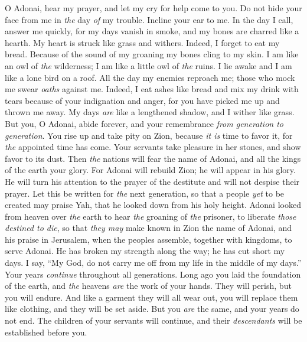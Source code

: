\begin{biblechapter} %
 O Adonai, hear my prayer, 
and let my cry for help come to you.
\verse Do not hide your face from me 
in \textit{the} day \textit{of} my trouble. 
Incline your ear to me. 
In the day I call, answer me quickly,
\verse for my days vanish in smoke, 
and my bones are charred like a hearth.
\verse My heart is struck like grass and withers. 
Indeed, I forget to eat my bread.
\verse Because of the sound of my groaning 
my bones cling to my skin.
\verse I am like an owl of \textit{the} wilderness; 
I am like a little owl of \textit{the} ruins.
\verse I lie awake and I am 
like a lone bird on a roof.
\verse All the day my enemies reproach me; 
those who mock me swear \textit{oaths} against me.
\verse Indeed, I eat ashes like bread 
and mix my drink with tears
\verse because of your indignation and anger, 
for you have picked me up and thrown me away.
\verse My days \textit{are} like a lengthened shadow, 
and I wither like grass.
\verse But you, O Adonai, abide forever, 
and your remembrance \textit{from generation to generation}.
\verse You rise up and take pity on Zion, 
because \textit{it is} time to favor it, 
for \textit{the} appointed time has come.
\verse Your servants take pleasure in her stones, 
and show favor to its dust.
\verse Then \textit{the} nations will fear the name of Adonai, 
and all the kings of the earth your glory.
\verse For Adonai will rebuild Zion; 
he will appear in his glory.
\verse He will turn his attention to the prayer of the destitute 
and will not despise their prayer.
\verse Let this be written for \textit{the} next generation, 
so that a people \textit{yet} to be created may praise Yah,
\verse that he looked down from his holy height. 
Adonai looked from heaven over \textit{the} earth
\verse to hear \textit{the} groaning of \textit{the} prisoner, 
to liberate \textit{those destined to die},
\verse so that \textit{they may} make known in Zion the name of Adonai, 
and his praise in Jerusalem,
\verse when the peoples assemble, 
together with kingdoms, to serve Adonai.
\verse He has broken my strength along the way; 
he has cut short my days.
\verse I say, “My God, do not carry me off 
from my life in the middle of my days.” 
Your years \textit{continue} throughout all generations.
\verse Long ago you laid the foundation of the earth, 
and \textit{the} heavens \textit{are} the work of your hands.
\verse They will perish, but you will endure. 
And like a garment they will all wear out, 
you will replace them like clothing, and they will be set aside.
\verse But you \textit{are} the same, 
and your years do not end.
\verse The children of your servants will continue, 
and their \textit{descendants} will be established before you.
\end{biblechapter}


